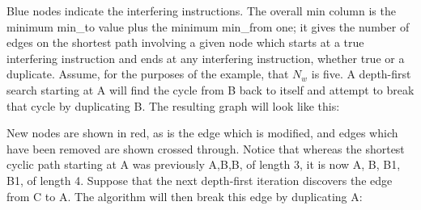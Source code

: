Blue nodes indicate the interfering instructions.  The overall min
column is the minimum min\_to value plus the minimum min\_from one; it
gives the number of edges on the shortest path involving a given node
which starts at a true interfering instruction and ends at any
interfering instruction, whether true or a duplicate.  Assume, for the
purposes of the example, that $N_w$ is five.  A depth-first search
starting at A will find the cycle from B back to itself and attempt to
break that cycle by duplicating B.  The resulting graph will look like
this:


New nodes are shown in red, as is the edge which is modified, and
edges which have been removed are shown crossed through.  Notice that
whereas the shortest cyclic path starting at A was previously A,B,B,
of length 3, it is now A, B, B1, B1, of length 4.  Suppose that the
next depth-first iteration discovers the edge from C to A.  The
algorithm will then break this edge by duplicating A:

